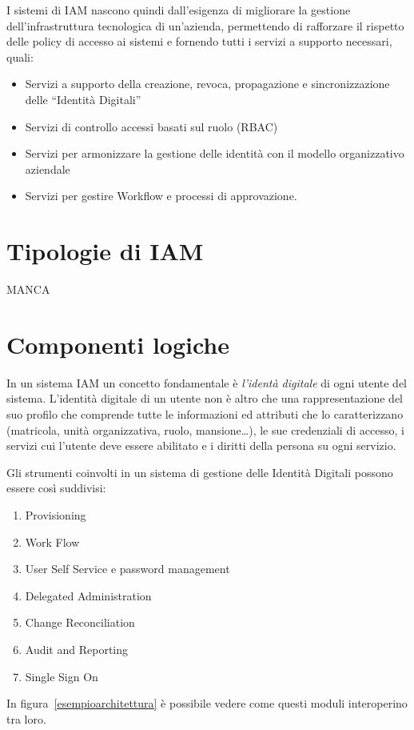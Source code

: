 I sistemi di IAM nascono quindi dall'esigenza di migliorare la gestione
dell'infrastruttura tecnologica di un'azienda, permettendo di rafforzare il
rispetto delle policy di accesso ai sistemi e fornendo tutti i servizi a
supporto necessari, quali:
\begin{itemize}
\item Servizi a supporto della creazione, revoca, propagazione e
sincronizzazione delle “Identità Digitali”
\item Servizi di controllo accessi basati sul ruolo (RBAC) 
\item Servizi per armonizzare la gestione delle identità con il modello
organizzativo aziendale
\item Servizi per gestire Workflow e processi di approvazione.
\end{itemize}

\section{Tipologie di IAM}

MANCA


\section{Componenti logiche}

In un sistema IAM un concetto fondamentale è \textit{l'identà
digitale} di ogni utente del sistema.
L'identità digitale di un utente non è altro che una rappresentazione del suo
profilo che comprende tutte le informazioni ed attributi che lo caratterizzano
(matricola, unità organizzativa, ruolo, mansione\ldots), le sue credenziali di
accesso, i servizi cui l’utente deve essere abilitato e i diritti della persona
su ogni servizio.

Gli strumenti coinvolti in un sistema di gestione delle Identità Digitali
possono essere così suddivisi:
\begin{enumerate}
\item Provisioning
\item Work Flow
\item User Self Service e password management
\item Delegated Administration
\item Change Reconciliation
\item Audit and Reporting
\item Single Sign On
\end{enumerate}

In figura~\ref{esempioarchitettura} è possibile vedere come questi moduli
interoperino tra loro.

